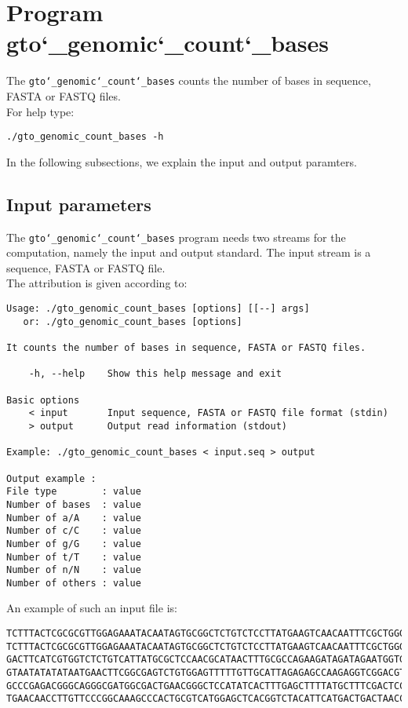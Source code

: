\section{Program gto\char`_genomic\char`_count\char`_bases}
The \texttt{gto\char`_genomic\char`_count\char`_bases} counts the number of bases in sequence, FASTA or FASTQ files.\\
For help type:
\begin{lstlisting}
./gto_genomic_count_bases -h
\end{lstlisting}
In the following subsections, we explain the input and output paramters.

\subsection*{Input parameters}

The \texttt{gto\char`_genomic\char`_count\char`_bases} program needs two streams for the computation, namely the input and output standard. The input stream is a sequence, FASTA or FASTQ file.\\
The attribution is given according to:
\begin{lstlisting}
Usage: ./gto_genomic_count_bases [options] [[--] args]
   or: ./gto_genomic_count_bases [options]

It counts the number of bases in sequence, FASTA or FASTQ files.

    -h, --help    Show this help message and exit

Basic options
    < input       Input sequence, FASTA or FASTQ file format (stdin)
    > output      Output read information (stdout)

Example: ./gto_genomic_count_bases < input.seq > output

Output example :
File type        : value
Number of bases  : value
Number of a/A    : value
Number of c/C    : value
Number of g/G    : value
Number of t/T    : value
Number of n/N    : value
Number of others : value
\end{lstlisting}
An example of such an input file is:
\begin{lstlisting}
TCTTTACTCGCGCGTTGGAGAAATACAATAGTGCGGCTCTGTCTCCTTATGAAGTCAACAATTTCGCTGGGACTTGCGGC
TCTTTACTCGCGCGTTGGAGAAATACAATAGTGCGGCTCTGTCTCCTTATGAAGTCAACAATTTCGCTGGGACTTGCGGC
GACTTCATCGTGGTCTCTGTCATTATGCGCTCCAACGCATAACTTTGCGCCAGAAGATAGATAGAATGGTGTAAGAAACT
GTAATATATATAATGAACTTCGGCGAGTCTGTGGAGTTTTTGTTGCATTAGAGAGCCAAGAGGTCGGACGTCCTCACGTA
GCCCGAGACGGGCAGGGCGATGGCGACTGAACGGGCTCCATATCACTTTGAGCTTTTATGCTTTCGACTCCTCCAGGAGC
TGAACAACCTTGTTCCCGGCAAAGCCCACTGCGTCATGGAGCTCACGGTCTACATTCATGACTGACTAACCGTAAACTGC
\end{lstlisting}

